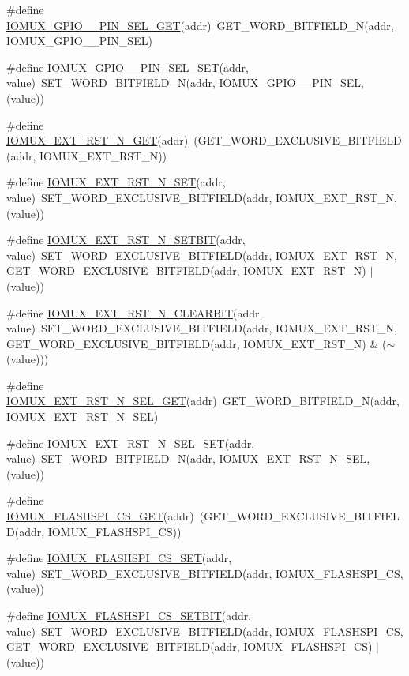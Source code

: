 \begin{DoxyCompactItemize}
\item 
\#define \hyperlink{a00559_a31879b1575ffa372fb8eb9a647d12fe7}{IOMUX\_\-GPIO\_\_\-PIN\_\-SEL\_\-GET}(addr)~GET\_\-WORD\_\-BITFIELD\_\-N(addr, IOMUX\_\-GPIO\_\_\-PIN\_\-SEL)
\item 
\#define \hyperlink{a00559_a05dda62d1427fde7db1fd022f61a9305}{IOMUX\_\-GPIO\_\_\-PIN\_\-SEL\_\-SET}(addr, value)~SET\_\-WORD\_\-BITFIELD\_\-N(addr, IOMUX\_\-GPIO\_\_\-PIN\_\-SEL, (value))
\item 
\#define \hyperlink{a00559_a83cb9e243ac6c8cc39a1bb7ef1fea131}{IOMUX\_\-EXT\_\-RST\_\-N\_\-GET}(addr)~(GET\_\-WORD\_\-EXCLUSIVE\_\-BITFIELD(addr, IOMUX\_\-EXT\_\-RST\_\-N))
\item 
\#define \hyperlink{a00559_a8364672705bf3a4e676bb608f546785d}{IOMUX\_\-EXT\_\-RST\_\-N\_\-SET}(addr, value)~SET\_\-WORD\_\-EXCLUSIVE\_\-BITFIELD(addr, IOMUX\_\-EXT\_\-RST\_\-N, (value))
\item 
\#define \hyperlink{a00559_a2ff23fa6bc575b55aa084d27b72759c3}{IOMUX\_\-EXT\_\-RST\_\-N\_\-SETBIT}(addr, value)~SET\_\-WORD\_\-EXCLUSIVE\_\-BITFIELD(addr, IOMUX\_\-EXT\_\-RST\_\-N, GET\_\-WORD\_\-EXCLUSIVE\_\-BITFIELD(addr, IOMUX\_\-EXT\_\-RST\_\-N) $|$ (value))
\item 
\#define \hyperlink{a00559_af5271a899a738fc1369c91212dbe2629}{IOMUX\_\-EXT\_\-RST\_\-N\_\-CLEARBIT}(addr, value)~SET\_\-WORD\_\-EXCLUSIVE\_\-BITFIELD(addr, IOMUX\_\-EXT\_\-RST\_\-N, GET\_\-WORD\_\-EXCLUSIVE\_\-BITFIELD(addr, IOMUX\_\-EXT\_\-RST\_\-N) \& ($\sim$(value)))
\item 
\#define \hyperlink{a00559_a348d702cfe452a54c63a9c27d1c8d5e9}{IOMUX\_\-EXT\_\-RST\_\-N\_\-SEL\_\-GET}(addr)~GET\_\-WORD\_\-BITFIELD\_\-N(addr, IOMUX\_\-EXT\_\-RST\_\-N\_\-SEL)
\item 
\#define \hyperlink{a00559_a4f06c936003925caf5a6118a01931154}{IOMUX\_\-EXT\_\-RST\_\-N\_\-SEL\_\-SET}(addr, value)~SET\_\-WORD\_\-BITFIELD\_\-N(addr, IOMUX\_\-EXT\_\-RST\_\-N\_\-SEL, (value))
\item 
\#define \hyperlink{a00559_a61b0a4721649e3ed45aa849312b68aa8}{IOMUX\_\-FLASHSPI\_\-CS\_\-GET}(addr)~(GET\_\-WORD\_\-EXCLUSIVE\_\-BITFIELD(addr, IOMUX\_\-FLASHSPI\_\-CS))
\item 
\#define \hyperlink{a00559_a6c78ddb212915f61dc004e51fdef9f80}{IOMUX\_\-FLASHSPI\_\-CS\_\-SET}(addr, value)~SET\_\-WORD\_\-EXCLUSIVE\_\-BITFIELD(addr, IOMUX\_\-FLASHSPI\_\-CS, (value))
\item 
\#define \hyperlink{a00559_aed7f187f94cb5f90604ac9e02f29cabd}{IOMUX\_\-FLASHSPI\_\-CS\_\-SETBIT}(addr, value)~SET\_\-WORD\_\-EXCLUSIVE\_\-BITFIELD(addr, IOMUX\_\-FLASHSPI\_\-CS, GET\_\-WORD\_\-EXCLUSIVE\_\-BITFIELD(addr, IOMUX\_\-FLASHSPI\_\-CS) $|$ (value))

\end{DoxyCompactItemize}
